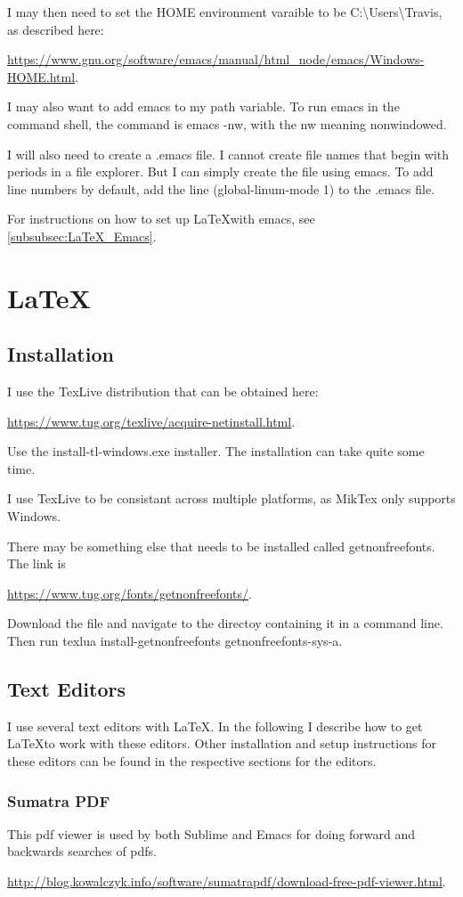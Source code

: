 \documentclass{article}
\newcommand{\web}[2]{
	\begin{center}
		\url{#1}{#2}
	\end{center}
}
\begin{document}
I may then need to set the HOME environment varaible to be C:\textbackslash{}Users\textbackslash{}Travis,
	as described here:
	\web{https://www.gnu.org/software/emacs/manual/html_node/emacs/Windows-HOME.html}.
I may also want to add emacs to my path variable.
To run emacs in the command shell, the command is emacs -nw, with the nw meaning nonwindowed.

I will also need to create a .emacs file.
I cannot create file names that begin with periods in a file explorer.
But I can simply create the file using emacs.
To add line numbers by default, add the line (global-linum-mode 1) to the .emacs file.

For instructions on how to set up \LaTeX with emacs, see \cref{subsubsec:LaTeX_Emacs}.

\section{\LaTeX}

\subsection{Installation}

I use the TexLive distribution that can be obtained here:
	\web{https://www.tug.org/texlive/acquire-netinstall.html}.
Use the install-tl-windows.exe installer.
The installation can take quite some time.

I use TexLive to be consistant across multiple platforms, as MikTex only supports Windows.

There may be something else that needs to be installed called getnonfreefonts.
The link is \web{https://www.tug.org/fonts/getnonfreefonts/}.
Download the file and navigate to the directoy containing it in a command line.
Then run texlua install-getnonfreefonts getnonfreefonts-sys-a.

\subsection{Text Editors}

I use several text editors with \LaTeX.
In the following I describe how to get \LaTeX to work with these editors.
Other installation and setup instructions for these editors can be found in the respective sections for the editors.

\subsubsection{Sumatra PDF}
This pdf viewer is used by both Sublime and Emacs for doing forward and backwards searches of pdfs.
	\web{http://blog.kowalczyk.info/software/sumatrapdf/download-free-pdf-viewer.html}.
\end{document}
